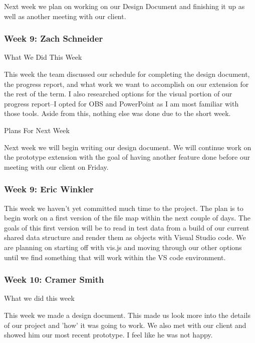 Next week we plan on working on our Design Document and finishing it up as well as another meeting with our client.  \\ 

 \subsubsection{Week 9: Zach Schneider}

What We Did This Week

This week the team discussed our schedule for completing the design document, the progress report, and what work we want to accomplish on our extension for the rest of the term. I also researched options for the visual portion of our progress report--I opted for OBS and PowerPoint as I am most familiar with those tools. Aside from this, nothing else was done due to the short week.

Plans For Next Week

Next week we will begin writing our design document. We will continue work on the prototype extension with the goal of having another feature done before our meeting with our client on Friday. \\ 

 \subsubsection{Week 9: Eric Winkler}

This week we haven't yet committed much time to the project. The plan is to begin work on a first version of the file map within the next couple of days. The goals of this first version will be to read in test data from a build of our current shared data structure and render them as objects with Visual Studio code. We are planning on starting off with vis.js and moving through our other options until we find something that will work within the VS code environment. \\ 

 \subsubsection{Week 10: Cramer Smith}

What we did this week 



This week we made a design document. This made us look more into the details of our project and 'how' it was going to work. We also met with our client and showed him our most recent prototype. I feel like he was not happy. 



